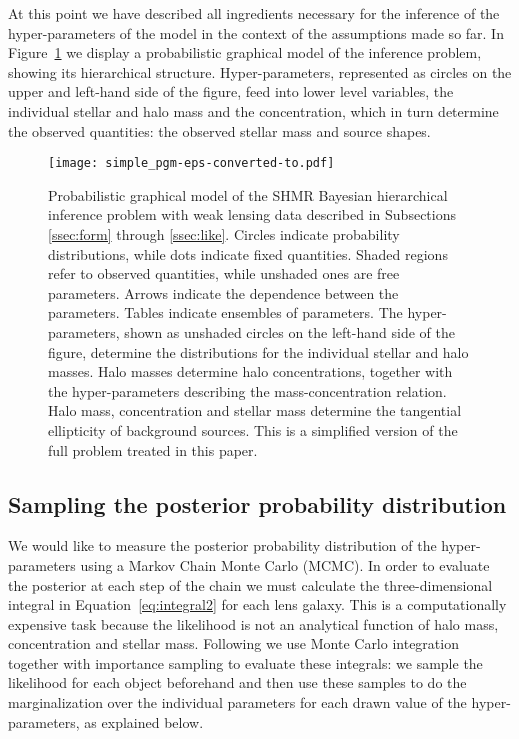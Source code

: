 \documentclass[usenatbib]{mnras}
\def\Fref#1{Figure~\ref{#1}\xspace}
\def\Eref#1{Equation~\ref{#1}\xspace}
\begin{document}
At this point we have described all ingredients necessary for the inference of the hyper-parameters of the model in the context of the assumptions made so far. In \Fref{fig:pgm1} we display a probabilistic graphical model of the inference problem, showing its hierarchical structure. Hyper-parameters, represented as circles on the upper and left-hand side of the figure, feed into lower level variables, the individual stellar and halo mass and the concentration, which in turn determine the observed quantities: the observed stellar mass and source shapes.
%
\begin{figure}
 \texttt{[image: simple\_pgm-eps-converted-to.pdf]}
 \caption{Probabilistic graphical model of the SHMR Bayesian hierarchical inference problem with weak lensing data described in Subsections \ref{ssec:form} through \ref{ssec:like}. 
Circles indicate probability distributions, while dots indicate fixed quantities. Shaded regions refer to observed quantities, while unshaded ones are free parameters. Arrows indicate the dependence between the parameters.
Tables indicate ensembles of parameters.
The hyper-parameters, shown as unshaded circles on the left-hand side of the figure, determine the distributions for the individual stellar and halo masses. Halo masses determine halo concentrations, together with the hyper-parameters describing the mass-concentration relation. Halo mass, concentration and stellar mass determine the tangential ellipticity of background sources.
This is a simplified version of the full problem treated in this paper.}
 \label{fig:pgm1}
\end{figure}
%

\subsection{Sampling the posterior probability distribution}\label{ssec:impsamp}

We would like to measure the posterior probability distribution of the hyper-parameters using a Markov Chain Monte Carlo (MCMC).
In order to evaluate the posterior at each step of the chain we must calculate the three-dimensional integral in \Eref{eq:integral2} for each lens galaxy. This is a computationally expensive task because the likelihood is not an analytical function of halo mass, concentration and stellar mass.
Following \citet{Sch++15} we use Monte Carlo integration together with importance sampling to evaluate these integrals: we sample the likelihood for each object beforehand and then use these samples to do the marginalization over the individual parameters for each drawn value of the hyper-parameters, as explained below.
\end{document}
